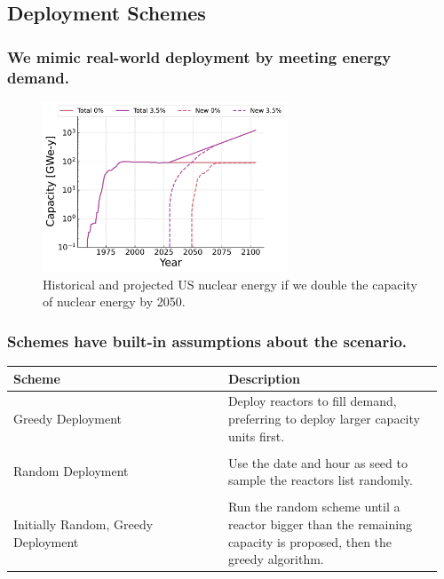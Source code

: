 \documentclass[9pt]{beamer}
\begin{document}
  \subsection{Deployment Schemes}
  \begin{frame}
    \frametitle{We mimic real-world deployment by meeting energy demand.}
    \begin{figure}
      \centering
      \includegraphics[width=0.65\textwidth]{images/new_capacity_ng_d2.pdf}
      \caption{Historical and projected US nuclear energy if we double the capacity of nuclear energy by 2050.}
    \end{figure}
  \end{frame}

  \begin{frame}
    \frametitle{Schemes have built-in assumptions about the scenario.}
    \begin{table}[H]
      \centering
      \label{tab:deployment_schemes}
      \newcommand{\ColWidth}{0.48\linewidth}
      \begin{tabular}{p{\ColWidth} p{\ColWidth}}
          \hline
          Scheme & Description \\
          \hline
          Greedy Deployment & Deploy reactors to fill demand, preferring to deploy larger capacity units first. \\
          \vspace{1.5mm}\\
          Random Deployment & Use the date and hour as seed to sample the
          reactors list randomly. \\
          \vspace{1.5mm}\\
          Initially Random, Greedy Deployment & Run the random scheme until
          a reactor bigger than the remaining capacity is proposed,
          then the greedy algorithm. \\
          \hline
      \end{tabular}
    \end{table}
  \end{frame}
\end{document}
